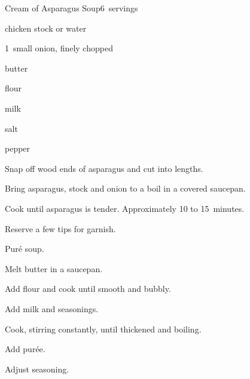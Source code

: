 \begin{recipe}{Cream of Asparagus Soup}{}{6~servings}

\begin{ingredients}
\item {} 
\item {} chicken stock or water
\item 1~small onion, finely chopped
\item {} butter
\item {} flour
\item {} milk
\item salt
\item pepper
\end{ingredients}

\begin{directions}
\item Snap off wood ends of asparagus and cut into  lengths.
\item Bring asparagus, stock and onion to a boil in a covered saucepan.
\item Cook until asparagus is tender. Approximately 10 to 15~minutes.
\item Reserve a few tips for garnish.
\item Puré soup.
\item Melt butter in a saucepan.
\item Add flour and cook until smooth and bubbly.
\item Add milk and seasonings.
\item Cook, stirring constantly, until thickened and boiling.
\item Add purée.
\item Adjust seasoning.
\end{directions}

\end{recipe}
